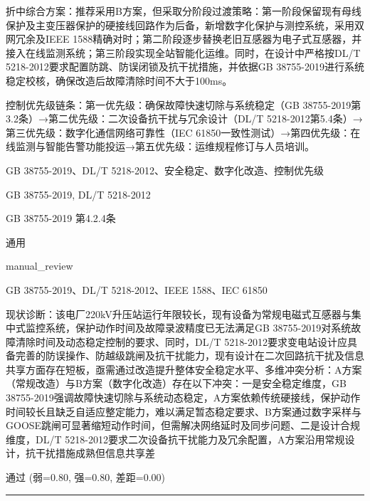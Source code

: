 \documentclass[11pt,a4paper]{ctexart}
\begin{document}
\begin{description}[leftmargin=1.5em,style=nextline,font=\normalfont]
折中综合方案：推荐采用B方案，但采取分阶段过渡策略：第一阶段保留现有母线保护及主变压器保护的硬接线回路作为后备，新增数字化保护与测控系统，采用双网冗余及IEEE 1588精确对时；第二阶段逐步替换老旧互感器为电子式互感器，并接入在线监测系统；第三阶段实现全站智能化运维。同时，在设计中严格按DL/T 5218-2012要求配置防跳、防误闭锁及抗干扰措施，并依据GB 38755-2019进行系统稳定校核，确保改造后故障清除时间不大于100ms。

控制优先级链条：第一优先级：确保故障快速切除与系统稳定（GB 38755-2019第3.2条）→第二优先级：二次设备抗干扰与冗余设计（DL/T 5218-2012第5.4条）→第三优先级：数字化通信网络可靠性（IEC 61850一致性测试）→第四优先级：在线监测与智能告警功能投运→第五优先级：运维规程修订与人员培训。
  \item[KW:] GB 38755-2019、DL/T 5218-2012、安全稳定、数字化改造、控制优先级
  \item[标准:] GB 38755-2019, DL/T 5218-2012
  \item[条款溯源:] GB 38755-2019 第4.2.4条
  \item[主题:] 通用
  \item[评分方式:] manual\_review
  \item[Rubric条款:] GB 38755-2019、DL/T 5218-2012、IEEE 1588、IEC 61850
  \item[Rubric判据:] 现状诊断：该电厂220kV升压站运行年限较长，现有设备为常规电磁式互感器与集中式监控系统，保护动作时间及故障录波精度已无法满足GB 38755-2019对系统故障清除时间及动态稳定控制的要求、同时，DL/T 5218-2012要求变电站设计应具备完善的防误操作、防越级跳闸及抗干扰能力，现有设计在二次回路抗干扰及信息共享方面存在短板，亟需通过改造提升整体安全稳定水平、多维冲突分析：A方案（常规改造）与B方案（数字化改造）存在以下冲突：一是安全稳定维度，GB 38755-2019强调故障快速切除与系统动态稳定，A方案依赖传统硬接线，保护动作时间较长且缺乏自适应整定能力，难以满足暂态稳定要求、B方案通过数字采样与GOOSE跳闸可显著缩短动作时间，但需解决网络延时及同步问题、二是设计合规维度，DL/T 5218-2012要求二次设备抗干扰能力及冗余配置，A方案沿用常规设计，抗干扰措施成熟但信息共享差
  \item[LJ判定:] 通过 (弱=0.80, 强=0.80, 差距=0.00)
\end{description}
\vspace{4pt}
\hrule
\vspace{6pt}
\end{document}
